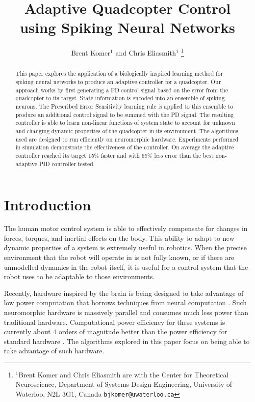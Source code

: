 \documentclass[letterpaper, 10 pt, conference]{ieeeconf}  %
\title{\LARGE \bf
Adaptive Quadcopter Control using Spiking Neural Networks
}
\author{Brent Komer$^{1}$ and Chris Eliasmith$^{1}$%
\thanks{$^{1}$Brent Komer and Chris Eliasmith are with the Center for Theoretical Neuroscience, Department of Systems Design Engineering,
        University of Waterloo, N2L 3G1, Canada
        {\tt\small bjkomer@uwaterloo.ca}}%
}
\begin{document}
\maketitle
\thispagestyle{empty}
\pagestyle{empty}


\begin{abstract}

This paper explores the application of a biologically inspired learning method for spiking neural networks to produce an adaptive controller for a quadcopter.
Our approach works by first generating a PD control signal based on the error from the quadcopter to its target.
State information is encoded into an ensemble of spiking neurons.
The Prescribed Error Sensitivity learning rule is applied to this ensemble to produce an additional control signal to be summed with the PD signal.
The resulting controller is able to learn non-linear functions of system state to account for unknown and changing dynamic properties of the quadcopter in its environment.
The algorithms used are designed to run efficiently on neuromorphic hardware.
Experiments performed in simulation demonstrate the effectiveness of the controller.
On average the adaptive controller reached its target 15\% faster and with 69\% less error than the best non-adaptive PID controller tested.


\end{abstract}


\section{Introduction}

The human motor control system is able to effectively compensate for changes in forces, torques, and inertial effects on the body.
This ability to adapt to new dynamic properties of a system is extremely useful in robotics.
When the precise environment that the robot will operate in is not fully known, or if there are unmodelled dynamics in the robot itself, it is useful for a control system that the robot uses to be adaptable to those environments.

Recently, hardware inspired by the brain is being designed to take advantage of low power computation that borrows techniques from neural computation \cite{hasler2013finding, khan2008spinnaker, boahen2006neurogrid}.
Such neuromorphic hardware is massively parallel and consumes much less power than traditional hardware.
Computational power efficiency for these systems is currently about 4 orders of magnitude better than the power efficiency for standard hardware \cite{hasler2013finding}.
The algorithms explored in this paper focus on being able to take advantage of such hardware.
\end{document}
